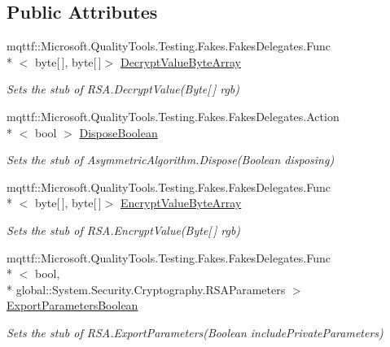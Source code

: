 \subsection*{Public Attributes}
\begin{DoxyCompactItemize}
\item 
mqttf\-::\-Microsoft.\-Quality\-Tools.\-Testing.\-Fakes.\-Fakes\-Delegates.\-Func\\*
$<$ byte\mbox{[}$\,$\mbox{]}, byte\mbox{[}$\,$\mbox{]}$>$ \hyperlink{class_system_1_1_security_1_1_cryptography_1_1_fakes_1_1_stub_r_s_a_aecd108e51d6c85bfdf0897bc52e520f3}{Decrypt\-Value\-Byte\-Array}
\begin{DoxyCompactList}\small\item\em Sets the stub of R\-S\-A.\-Decrypt\-Value(\-Byte\mbox{[}$\,$\mbox{]} rgb)\end{DoxyCompactList}\item 
mqttf\-::\-Microsoft.\-Quality\-Tools.\-Testing.\-Fakes.\-Fakes\-Delegates.\-Action\\*
$<$ bool $>$ \hyperlink{class_system_1_1_security_1_1_cryptography_1_1_fakes_1_1_stub_r_s_a_acccf1c7e476238f7e18c6600a735a727}{Dispose\-Boolean}
\begin{DoxyCompactList}\small\item\em Sets the stub of Asymmetric\-Algorithm.\-Dispose(\-Boolean disposing)\end{DoxyCompactList}\item 
mqttf\-::\-Microsoft.\-Quality\-Tools.\-Testing.\-Fakes.\-Fakes\-Delegates.\-Func\\*
$<$ byte\mbox{[}$\,$\mbox{]}, byte\mbox{[}$\,$\mbox{]}$>$ \hyperlink{class_system_1_1_security_1_1_cryptography_1_1_fakes_1_1_stub_r_s_a_a5848e15ecafbb515408e92f8ef291734}{Encrypt\-Value\-Byte\-Array}
\begin{DoxyCompactList}\small\item\em Sets the stub of R\-S\-A.\-Encrypt\-Value(\-Byte\mbox{[}$\,$\mbox{]} rgb)\end{DoxyCompactList}\item 
mqttf\-::\-Microsoft.\-Quality\-Tools.\-Testing.\-Fakes.\-Fakes\-Delegates.\-Func\\*
$<$ bool, \\*
global\-::\-System.\-Security.\-Cryptography.\-R\-S\-A\-Parameters $>$ \hyperlink{class_system_1_1_security_1_1_cryptography_1_1_fakes_1_1_stub_r_s_a_a8f20c26541b40eb5fdf15a4a80b1468a}{Export\-Parameters\-Boolean}
\begin{DoxyCompactList}\small\item\em Sets the stub of R\-S\-A.\-Export\-Parameters(\-Boolean include\-Private\-Parameters)\end{DoxyCompactList}\item 

\end{DoxyCompactItemize}

